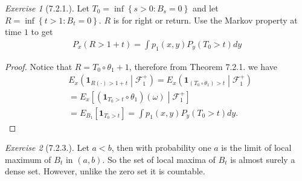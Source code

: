 \documentclass[12pt,a4paper]{amsart}
\theoremstyle{plain}
\theoremstyle{definition}
\theoremstyle{remark}
\newtheorem*{exe}{Exercise}
\numberwithin{equation}{section}
\begin{document}
\begin{exe}[7.2.1.]
  Let $T_0 = \inf\left\{ s> 0: B_s = 0 \right\}$ and let $R = \inf \left\{ t > 1: B_t = 0 \right\}$. $R$ is for right or return. Use the Markov property at time $1$ to get 
  \begin{align}
P_x(R > 1+t)  = \int p_1(x,y) P_y(T_0 > t) dy
  \end{align}
\end{exe}
\begin{proof}
Notice that $R = T_0 \circ \theta_1 + 1$, therefore from Theorem 7.2.1. we have
\begin{align}
  &E_x\left(  \mathbf 1_{R(\cdot)> 1+t} \middle| \mathcal F_1^+ \right)
= E_x\left(  \mathbf 1_{ (T_0 \circ \theta_1)>t} \middle| \mathcal F_1^+ \right)
\\&  = E_x\left[  \left(\mathbf 1_{ T_0>t} \circ \theta_1 \right)(\omega) \middle| \mathcal F_1^+ \right]
  \\&  = E_{B_1}\left[  \mathbf 1_{ T_0>t} \right] = \int p_1(x,y) P_y(T_0 > t) dy.
\end{align}
\end{proof}
\begin{exe}[7.2.3.]
Let $a< b$, then with probability one $a$ is the limit of local maximum of $B_t$ in $(a,b)$.
So the set of local maxima of $B_t$ is almost surely a dense set.
However, unlike the zero set it is countable.
\end{exe}
\end{document}
